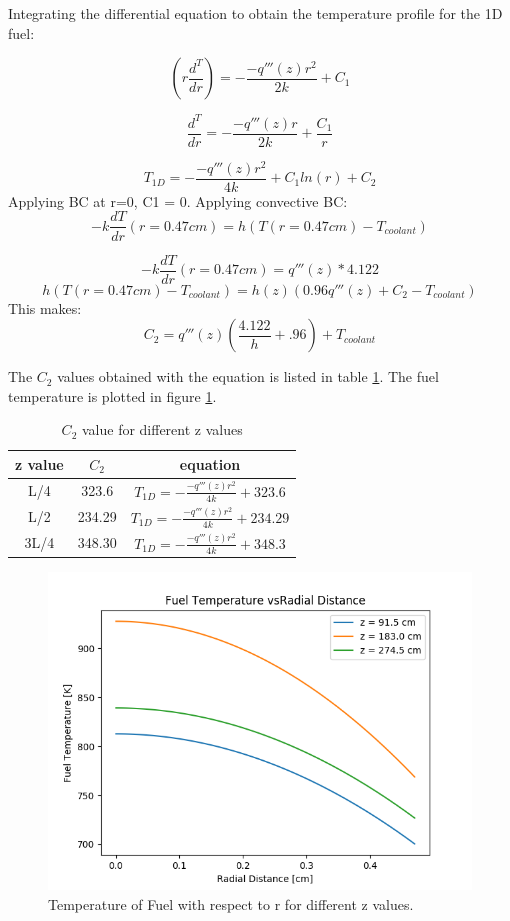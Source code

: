 \documentclass[12pt,letterpaper]{article}
\begin{document}
Integrating the differential equation to obtain the temperature profile for the
1D fuel:


\[ (r \frac{d^T}{dr}) = -\frac{-q'''(z)r^2}{2k} + C_1 \]

\[ \frac{d^T}{dr} = -\frac{-q'''(z)r}{2k} + \frac{C_1}{r} \]

\[ T_{1D} = -\frac{-q'''(z)r^2}{4k} + C_1 ln(r) + C_2 \]
Applying BC at r=0, C1 = 0.
Applying convective BC:
\[ -k \frac{dT}{dr}(r= 0.47 cm) = h (T(r = 0.47 cm ) - T_{coolant})\]

\[-k \frac{dT}{dr}(r = 0.47 cm) = q'''(z) * 4.122\]
\[h (T(r = 0.47 cm ) - T_{coolant}) = h(z) (0.96 q'''(z)  + C_2 - T_{coolant}) \]
This makes:
\[C_2 = q'''(z) (\frac{4.122}{h} +.96) + T_{coolant}\]

The $C_2$ values obtained with the equation is listed in table \ref{tab:c2}.
The fuel temperature is plotted in figure \ref{fig:t_f_r}.

\begin{table}[h]
     \centering
    \begin{tabular}{ccc}
       \hline
       z value & $C_2$ & equation \\
       \hline
       L/4 & 323.6  & $T_{1D} = -\frac{-q'''(z)r^2}{4k} + 323.6$ \\
       L/2 & 234.29 & $T_{1D} = -\frac{-q'''(z)r^2}{4k} + 234.29$ \\
       3L/4 & 348.30 & $T_{1D} = -\frac{-q'''(z)r^2}{4k} + 348.3$\\
       \hline
    \end{tabular}
    \caption {$C_2$ value for different z values}
    \label{tab:c2}
\end{table}


\begin{figure}[htbp!]
    \begin{center}
        \includegraphics[scale=0.7]{t_f_r.png}
    \end{center}
    \caption{Temperature of Fuel with respect to r for different z values.}
    \label{fig:t_f_r}
\end{figure}
\end{document}
